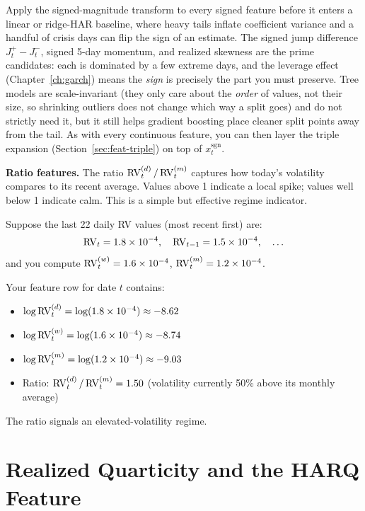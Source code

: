 \begin{projectconnection}
Apply the signed-magnitude transform to every signed feature before it enters a linear or ridge-HAR baseline, where heavy tails inflate coefficient variance and a handful of crisis days can flip the sign of an estimate. The signed jump difference $J_t^+ - J_t^-$, signed 5-day momentum, and realized skewness are the prime candidates: each is dominated by a few extreme days, and the leverage effect (Chapter~\ref{ch:garch}) means the \emph{sign} is precisely the part you must preserve. Tree models are scale-invariant (they only care about the \emph{order} of values, not their size, so shrinking outliers does not change which way a split goes) and do not strictly need it, but it still helps gradient boosting place cleaner split points away from the tail. As with every continuous feature, you can then layer the triple expansion (Section~\ref{sec:feat-triple}) on top of $x_t^{\text{sgn}}$.
\end{projectconnection}

\textbf{Ratio features.} The ratio $\operatorname{RV}_t^{(d)} / \operatorname{RV}_t^{(m)}$ captures how today's volatility compares to its recent average.
Values above 1 indicate a local spike; values well below 1 indicate calm.
This is a simple but effective regime indicator.

\begin{workedexample}
Suppose the last 22 daily RV values (most recent first) are:
\[
\operatorname{RV}_t = 1.8 \times 10^{-4}, \quad \operatorname{RV}_{t-1} = 1.5 \times 10^{-4}, \quad \ldots
\]
and you compute $\operatorname{RV}_t^{(w)} = 1.6 \times 10^{-4}$, $\operatorname{RV}_t^{(m)} = 1.2 \times 10^{-4}$.

Your feature row for date $t$ contains:
\begin{itemize}[nosep]
  \item $\log \operatorname{RV}_t^{(d)} = \log(1.8 \times 10^{-4}) \approx -8.62$
  \item $\log \operatorname{RV}_t^{(w)} = \log(1.6 \times 10^{-4}) \approx -8.74$
  \item $\log \operatorname{RV}_t^{(m)} = \log(1.2 \times 10^{-4}) \approx -9.03$
  \item Ratio: $\operatorname{RV}_t^{(d)} / \operatorname{RV}_t^{(m)} = 1.50$ (volatility currently 50\% above its monthly average)
\end{itemize}
The ratio signals an elevated-volatility regime.
\end{workedexample}

\section{Realized Quarticity and the HARQ Feature}\label{sec:feat-rq}

